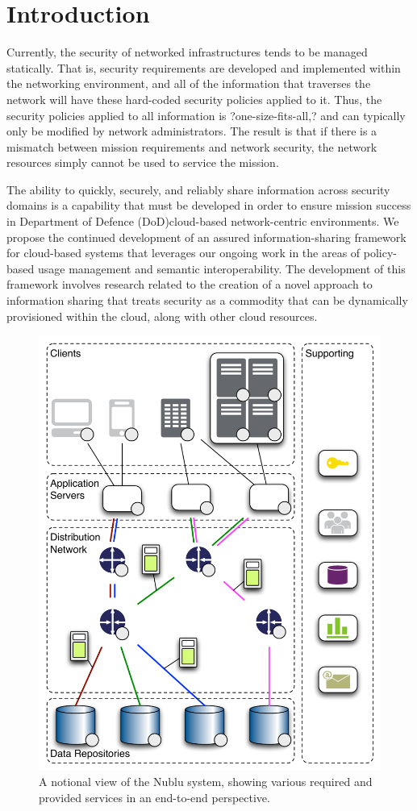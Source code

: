 \documentclass[10pt,letterpaper]{article}
\author{Christopher C. Lamb}
\begin{document}
\section{Introduction}
\label{sec:intro}
Currently, the security of networked infrastructures tends to be managed statically. That is, security requirements are developed and implemented within the networking environment, and all of the information that traverses the network will have these hard-coded security policies applied to it. Thus, the security policies applied to all information is ?one-size-fits-all,? and can typically only be modified by network administrators. The result is that if there is a mismatch between mission requirements and network security, the network resources simply cannot be used to service the mission.

The ability to quickly, securely, and reliably share information across security domains is a capability that must be developed in order to ensure mission success in Department of Defence (DoD)cloud-based network-centric environments. We propose the continued development of an assured information-sharing framework for cloud-based systems that leverages our ongoing work in the areas of policy-based usage management and semantic interoperability. The development of this framework involves research related to the creation of a novel approach to information sharing that treats security as a commodity that can be dynamically provisioned within the cloud, along with other cloud resources.

\begin{figure}
\begin{center}
\includegraphics[width=.47\textwidth]{./images/network.pdf}
\end{center}
\caption{A notional view of the Nublu system, showing various required and provided services in an end-to-end perspective.}
\label{fig:network}
\end{figure}
\end{document}
